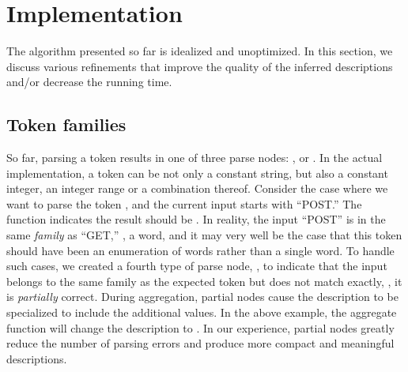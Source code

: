 \section{Implementation}
\label{sec:imp}
The algorithm presented so far is idealized and unoptimized.
In this section, we discuss various refinements that improve the 
quality of the inferred descriptions and/or decrease the running time.

\subsection{Token families}
So far,
parsing a  token results
in one of three parse nodes: ,  or . 
In the actual implementation, a  token can be not only a constant string, but also
a constant integer, an integer range or a combination thereof.
Consider the case where we want to parse the token ,
and the current input starts with ``POST.'' The
 function indicates the result should be .
In reality, the input ``POST'' is in the same {\em family} as ``GET,'' 
\ie{}, a word,
and it may very well be the case that this  token should have been 
an enumeration of words rather than a single word.
To handle such cases, we created a fourth type of parse node, , 
to indicate that the input belongs to the same family as the expected
token but does not match exactly, \ie, it is {\em partially} correct.
During aggregation, partial nodes cause the description 
to be specialized to include the additional values.  In the above example, the aggregate 
function will change the description to .
In our experience, partial nodes greatly reduce the number of parsing errors
and produce more compact and meaningful descriptions.


